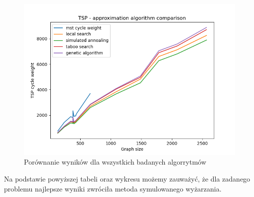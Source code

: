 \documentclass[12pt]{article}
\begin{document}
        \begin{figure}[htpb]
        \centering
            \includegraphics[width=0.7\linewidth]{img/algs.png}
            \caption{Porównanie wyników dla wszystkich badanych algorrytmów}
        \end{figure}

        \noindent
        Na podstawie powyższej tabeli oraz wykresu możemy zauważyć, że dla zadanego problemu najlepsze wyniki zwróciła metoda symulowanego wyżarzania.

        \newpage
\end{document}

